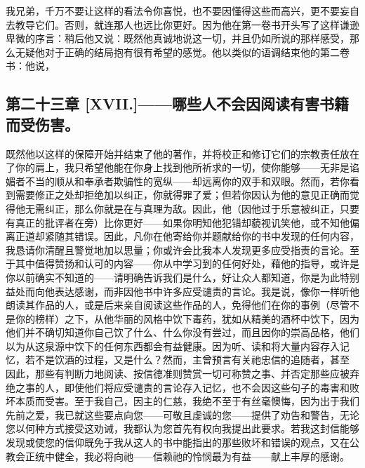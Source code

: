 我兄弟，千万不要让这样的看法令你喜悦，也不要因懂得这些而高兴，更不要妄自去教导它们。否则，就连那人也远比你更好。因为他在第一卷书开头写了这样谦逊卑微的序言：稍后他又说：既然他真诚地说这一切，并且仍如所说的那样感受，那么无疑他对于正确的结局抱有很有希望的感觉。他以类似的语调结束他的第二卷书：他说，\par


\subsection{第二十三章 [XVII.]——哪些人不会因阅读有害书籍而受伤害。}

既然他以这样的保障开始并结束了他的著作，并将校正和修订它们的宗教责任放在了你的肩上，我只希望他能在你身上找到他所祈求的一切，使你能够——无非是谄媚者不当的顺从和奉承者欺骗性的宽纵——却远离你的双手和双眼。然而，若你看到需要修正之处却拒绝加以纠正，你就得罪了爱；但若你因认为他的意见正确而觉得他无需纠正，那么你就是在与真理为敌。因此，他（因他过于乐意被纠正，只要有真正的批评者在旁）比你更好——如果你明知他犯错却藐视讥笑他，或不知他偏离正道却紧随其错误。因此，凡你在他寄给你并题献给你的书中发现的任何内容，我恳请你清醒且警觉地加以思量；你或许会比我本人发现更多应受指责的言论。至于其中值得赞扬和认可的内容——你从中学习到的任何好处，藉他的指导，或许是你以前确实不知道的——请明确告诉我们是什么，好让众人都知道，你是为此特别益处而向他表达感谢，而非因他书中许多应受谴责的言论。我是说，像你一样听他朗读其作品的人，或是后来亲自阅读这些作品的人，免得他们在你的事例（尽管不是你的榜样）之下，从他华丽的风格中饮下毒药，犹如从精美的酒杯中饮下，因为他们并不确切知道你自己饮了什么、什么你没有尝过，而且因你的崇高品格，他们以为从这泉源中饮下的任何东西都会有益健康。因为听、读和将大量内容存入记忆，若不是饮酒的过程，又是什么？然而，主曾预言有关祂忠信的追随者，甚至 因此，那些有判断力地阅读、按信德准则赞赏一切可称赞之事、并否定那些应被弃绝之事的人，即使他们将应受谴责的言论存入记忆，也不会因这些句子的毒害和败坏本质而受害。至于我自己，因主的仁慈，我绝不至于有丝毫懊悔，因为出于我们先前之爱，我已就这些要点向您——可敬且虔诚的您——提供了劝告和警告，无论您以何种方式接受这劝诫，我都认为您首先有权向我提出此要求。若我这封信能够发现或使您的信仰既免于我从这人的书中能指出的那些败坏和错误的观点，又在公教会正统中健全，我必将向祂——信赖祂的怜悯最为有益——献上丰厚的感谢。\par

